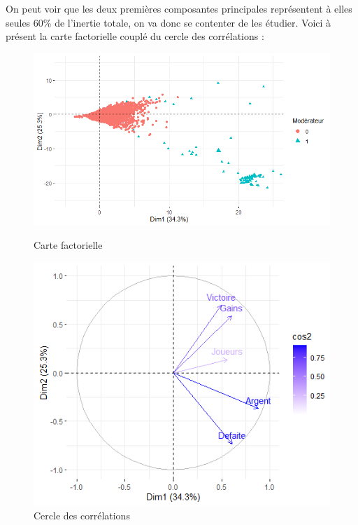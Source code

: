 \documentclass[a4paper, 12pt]{article}
\theoremstyle{exo}
\begin{document}
\noindent On peut voir que les deux premières composantes principales représentent à elles seules 60\% de l'inertie totale, on va donc se contenter de les étudier. Voici à présent la carte factorielle couplé du cercle des corrélations :

\begin{figure}[H]
\centering
    \begin{minipage}{0.58\textwidth}
        \centering
        \includegraphics[width=\textwidth]{figures/Individus.png}
        \caption{Carte factorielle}
    \end{minipage}
    \begin{minipage}{0.41\textwidth}
        \centering
        \includegraphics[width=\textwidth]{figures/Cercle.png}
        \caption{Cercle des corrélations}
    \end{minipage}
\end{figure}
\end{document}
